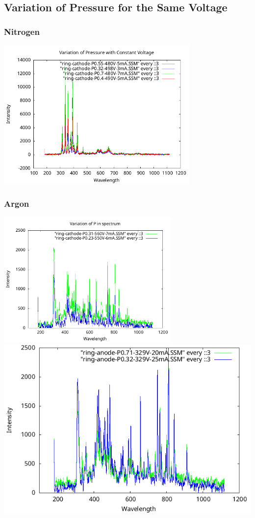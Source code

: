 \documentclass[]{report}[12 pt]
\begin{document}
\subsection{Variation of Pressure for the Same Voltage}
\subsubsection{Nitrogen}
\begin{center}
	\includegraphics[width=10cm]{PvsV480N.png}
\end{center}
\subsubsection{Argon}
\begin{center}
	\includegraphics[width=9cm]{PV555Ar.png}
	\includegraphics[width=9 cm]{PV329(anode)Armod.png}
\end{center}
\end{document}
